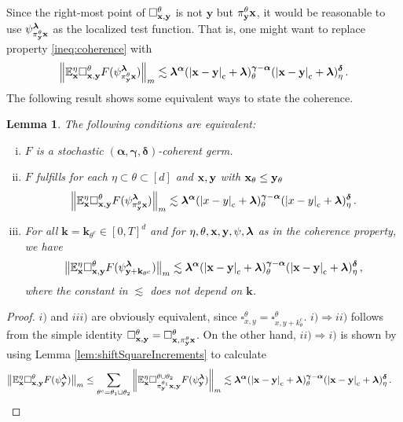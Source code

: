 \documentclass[12pt]{article}
\numberwithin{equation}{section}
\theoremstyle{plain}
\newtheorem{lemma}[theorem]{Lemma}
\theoremstyle{definition}
\newcommand{\compAbs}[1]{\left\vert#1\right\vert_{\text{c}}}
\newcommand{\norm}[1]{\left\Vert #1\right\Vert}
\def\bE{\mathbb{E}}\def\bW{\mathbb{W}}
\def\fk{\mathbf k}\def\fl{\mathbf l}
\def\fy{\mathbf y}\def\fz{\mathbf z}
\def\falpha{{\boldsymbol\alpha}}
\def\fgamma{{\boldsymbol\gamma}}
\def\fdelta{{\boldsymbol\delta}}
\def\flambda{{\boldsymbol\lambda}}
\begin{document}
Since the right-most point of $\square_{\fx,\fy}^\theta$ is not $\fy$ but $\pi^\theta_\fy \fx$, it would be reasonable to use $\psi_{\pi^\theta_\fy\fx}^\flambda$ as the localized test function. That is, one might want to replace property \eqref{ineq:coherence} with
\begin{equation*}
    \norm{\bE^\eta_\fx \square^\theta_{\fx,\fy} F(\psi_{\pi^\theta_{\fy}\fx}^{\flambda})}_{m} \lesssim \flambda^{\falpha}(\compAbs{\fx-\fy}+\flambda)^{\fgamma-\falpha}_{\theta}(\compAbs{\fx-\fy}+\flambda)^{\fdelta}_{\eta}\,.
\end{equation*}
The following result shows some equivalent ways to state the coherence.
\begin{lemma}
    The following conditions are equivalent:
    \begin{enumerate}[i)]
        \item $F$ is a stochastic $(\falpha,\fgamma,\fdelta)$-coherent germ.
        \item $F$ fulfills for each $\eta\subset\theta\subset[d]$ and $\fx,\fy$ with $\fx_{\theta}\le\fy_{\theta}$
        \begin{equation*}    \norm{\bE^\eta_\fx\square_{\fx,\fy}^\theta F(\psi_{\pi^\theta_\fy\fx}^{\flambda})}_m \lesssim \flambda^{\falpha}(\compAbs{x-y}+\flambda)^{\fgamma-\falpha}_{\theta}(\compAbs{x-y}+\flambda)^{\fdelta}_{\eta}\,.
        \end{equation*}
        \item For all $\fk = \fk_{\theta^c}\in [0,T]^d$ and for $\eta,\theta,\fx,\fy,\psi,\flambda$ as in the coherence property, we have
        \begin{equation*}
\norm{\bE^\eta_\fx\square_{\fx,\fy}^\theta F(\psi_{\fy+\fk_{\theta^c}}^{\flambda})}_m \lesssim \flambda^{\falpha}(\compAbs{\fx-\fy}+\flambda)^{\fgamma-\falpha}_{\theta}(\compAbs{\fx-\fy}+\flambda)^{\fdelta}_{\eta}\,,
        \end{equation*}
 where the constant in $\lesssim$ does not depend on $\fk$.
    \end{enumerate}
\end{lemma}
\begin{proof}
    $i)$ and $iii)$ are obviously equivalent, since $\square^\theta_{x,y} = \square^\theta_{x,y+{k_\theta^c}}$. 
    $i)\Rightarrow ii)$ follows from the simple identity $\square_{\fx,\fy}^\theta = \square_{\fx,\pi_\fy^\theta\fx}^\theta$.
    On the other hand, $ii)\Rightarrow i)$ is shown by using Lemma \ref{lem:shiftSquareIncrements} to calculate
    \begin{align*}
        \norm{\bE^\eta_\fx\square_{\fx,\fy}^\theta F(\psi_\fy^{\flambda})}_m &\le \sum_{\theta^c = \theta_1\sqcup\theta_2}\norm{\bE^\eta_\fx \square^{\theta\cup\theta_2}_{\pi_\fy^{\theta_1} \fx,\fy}F(\psi_\fy^{\flambda})}_m\lesssim\flambda^{\falpha}(\compAbs{\fx-\fy}+\flambda)^{\fgamma-\falpha}_{\theta}(\compAbs{\fx-\fy}+\flambda)^{\fdelta}_{\eta}\,.
    \end{align*}
\end{proof}
\end{document}
